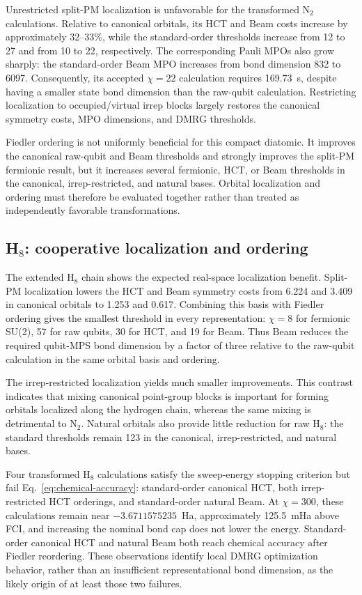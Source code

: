 \documentclass[a4paper,onecolumn,10pt]{article}
\begin{document}
Unrestricted split-PM localization is unfavorable for the transformed N$_2$
calculations.  Relative to canonical orbitals, its HCT and Beam costs increase
by approximately 32--33\%, while the standard-order thresholds increase from
12 to 27 and from 10 to 22, respectively.  The corresponding Pauli MPOs also
grow sharply: the standard-order Beam MPO increases from bond dimension 832
to 6097.  Consequently, its accepted $\chi=22$ calculation requires
169.73~s, despite having a smaller state bond dimension than the raw-qubit
calculation.  Restricting localization to occupied/virtual irrep blocks
largely restores the canonical symmetry costs, MPO dimensions, and DMRG
thresholds.

Fiedler ordering is not uniformly beneficial for this compact diatomic.  It
improves the canonical raw-qubit and Beam thresholds and strongly improves the
split-PM fermionic result, but it increases several fermionic, HCT, or Beam
thresholds in the canonical, irrep-restricted, and natural bases.  Orbital
localization and ordering must therefore be evaluated together rather than
treated as independently favorable transformations.

\subsection{\texorpdfstring{H$_8$}{H8}: cooperative localization and ordering}

The extended H$_8$ chain shows the expected real-space localization benefit.
Split-PM localization lowers the HCT and Beam symmetry costs from 6.224 and
3.409 in canonical orbitals to 1.253 and 0.617.  Combining this basis with
Fiedler ordering gives the smallest threshold in every representation:
$\chi=8$ for fermionic SU(2), 57 for raw qubits, 30 for HCT, and 19 for Beam.
Thus Beam reduces the required qubit-MPS bond dimension by a factor of three
relative to the raw-qubit calculation in the same orbital basis and ordering.

The irrep-restricted localization yields much smaller improvements.  This
contrast indicates that mixing canonical point-group blocks is important for
forming orbitals localized along the hydrogen chain, whereas the same mixing
is detrimental to N$_2$.  Natural orbitals also provide little reduction for
raw H$_8$: the standard thresholds remain 123 in the canonical,
irrep-restricted, and natural bases.

Four transformed H$_8$ calculations satisfy the sweep-energy stopping
criterion but fail Eq.~\eqref{eq:chemical-accuracy}: standard-order canonical
HCT, both irrep-restricted HCT orderings, and standard-order natural Beam.  At
$\chi=300$, these calculations remain near $-3.6711575235$~Ha, approximately
125.5~mHa above FCI, and increasing the nominal bond cap does not lower the
energy.  Standard-order canonical HCT and natural Beam both reach chemical
accuracy after Fiedler reordering.  These observations identify local DMRG
optimization behavior, rather than an insufficient representational bond
dimension, as the likely origin of at least those two failures.
\end{document}
